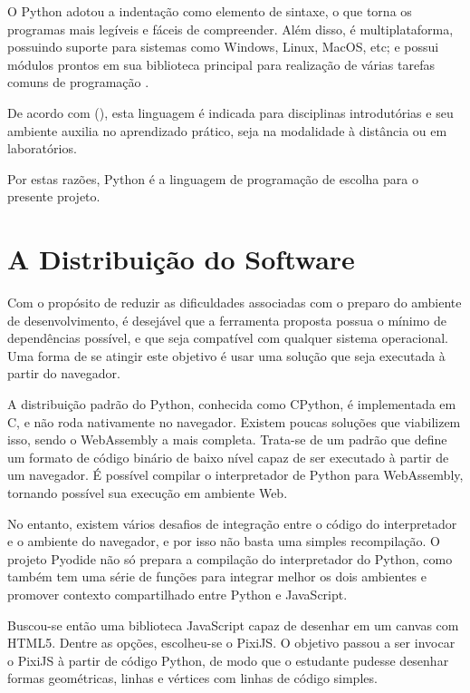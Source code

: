 O Python adotou a indentação como elemento de sintaxe, o que torna os programas mais legíveis e fáceis de compreender. Além disso, é multiplataforma, possuindo suporte para sistemas como Windows, Linux, MacOS, etc; e possui módulos prontos em sua biblioteca principal para realização de várias tarefas comuns de programação \cite{moraispires2002}.

De acordo com \citeauthor{fangohr2004} (\citeyear{fangohr2004}), esta linguagem é indicada para disciplinas introdutórias e seu ambiente auxilia no aprendizado prático, seja na modalidade à distância ou em laboratórios. 

Por estas razões, Python é a linguagem de programação de escolha para o presente projeto.

\section{A Distribuição do Software}

Com o propósito de reduzir as dificuldades associadas com o preparo do ambiente de desenvolvimento, é desejável que a ferramenta proposta possua o mínimo de dependências possível, e que seja compatível com qualquer sistema operacional. Uma forma de se atingir este objetivo é usar uma solução que seja executada à partir do navegador.

A distribuição padrão do Python, conhecida como CPython, é implementada em C, e não roda nativamente no navegador. Existem poucas soluções que viabilizem isso, sendo o WebAssembly a mais completa. Trata-se de um padrão que define um formato de código binário de baixo nível capaz de ser executado à partir de um navegador. É possível compilar o interpretador de Python para WebAssembly, tornando possível sua execução em ambiente Web.

No entanto, existem vários desafios de integração entre o código do interpretador e o ambiente do navegador, e por isso não basta uma simples recompilação. O projeto Pyodide não só prepara a compilação do interpretador do Python, como também tem uma série de funções para integrar melhor os dois ambientes e promover contexto compartilhado entre Python e JavaScript.

Buscou-se então uma biblioteca JavaScript capaz de desenhar em um canvas com HTML5. Dentre as opções, escolheu-se o PixiJS. O objetivo passou a ser invocar o PixiJS à partir de código Python, de modo que o estudante pudesse desenhar formas geométricas, linhas e vértices com linhas de código simples.


